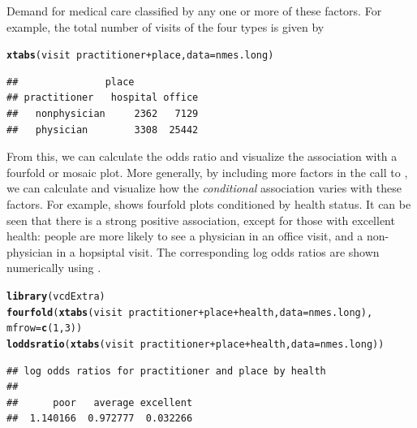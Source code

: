 \documentclass[11pt]{book}\usepackage[]{graphicx}\usepackage[]{color}
\makeatletter
\newcommand{\hlnum}[1]{\textcolor[rgb]{0.686,0.059,0.569}{#1}}%
\newcommand{\hlopt}[1]{\textcolor[rgb]{0,0,0}{#1}}%
\newcommand{\hlstd}[1]{\textcolor[rgb]{0.345,0.345,0.345}{#1}}%
\newcommand{\hlkwc}[1]{\textcolor[rgb]{0.333,0.667,0.333}{#1}}%
\newcommand{\hlkwd}[1]{\textcolor[rgb]{0.737,0.353,0.396}{\textbf{#1}}}%
\newenvironment{kframe}{%
 \def\at@end@of@kframe{}%
 \ifinner\ifhmode%
  \def\at@end@of@kframe{\end{minipage}}%
  \begin{minipage}{\columnwidth}%
 \fi\fi%
 \def\FrameCommand##1{\hskip\@totalleftmargin \hskip-\fboxsep
 \colorbox{shadecolor}{##1}\hskip-\fboxsep
     \hskip-\linewidth \hskip-\@totalleftmargin \hskip\columnwidth}%
 \MakeFramed {\advance\hsize-\width
   \@totalleftmargin\z@ \linewidth\hsize
   \@setminipage}}%
 {\par\unskip\endMakeFramed%
 \at@end@of@kframe}
\newenvironment{knitrout}{}{} %
\renewenvironment{knitrout}{\small\renewcommand{\baselinestretch}{.85}}{} %
\makeatother
\begin{document}
\begin{Example}[nmes4]{Demand for medical care}
classified by any one or more of these factors.  For example, the total number of visits of the four
types is given by
\begin{knitrout}
\color{fgcolor}\begin{kframe}
\begin{alltt}
\hlkwd{xtabs}\hlstd{(visit} \hlopt{~} \hlstd{practitioner} \hlopt{+} \hlstd{place,} \hlkwc{data}\hlstd{=nmes.long)}
\end{alltt}
\begin{verbatim}
##               place
## practitioner   hospital office
##   nonphysician     2362   7129
##   physician        3308  25442
\end{verbatim}
\end{kframe}
\end{knitrout}
From this, we can calculate the odds ratio and visualize the association with a fourfold or
mosaic plot. More generally, by including more factors in the call to , we can
calculate and visualize how the \emph{conditional} association varies with these factors.
For example,  shows fourfold plots conditioned by health status.
It can be seen that there is a strong positive association, except for those with
excellent health: people are more likely to see a physician in an office visit, and a
non-physician in a hopsiptal visit. The corresponding log odds ratios are shown numerically
using .

\begin{knitrout}
\color{fgcolor}\begin{kframe}
\begin{alltt}
\hlkwd{library}\hlstd{(vcdExtra)}
\hlkwd{fourfold}\hlstd{(}\hlkwd{xtabs}\hlstd{(visit} \hlopt{~} \hlstd{practitioner} \hlopt{+} \hlstd{place} \hlopt{+} \hlstd{health,} \hlkwc{data}\hlstd{=nmes.long),}
         \hlkwc{mfrow}\hlstd{=}\hlkwd{c}\hlstd{(}\hlnum{1}\hlstd{,}\hlnum{3}\hlstd{))}
\hlkwd{loddsratio}\hlstd{(}\hlkwd{xtabs}\hlstd{(visit} \hlopt{~} \hlstd{practitioner} \hlopt{+} \hlstd{place} \hlopt{+} \hlstd{health,} \hlkwc{data}\hlstd{=nmes.long))}
\end{alltt}
\begin{verbatim}
## log odds ratios for practitioner and place by health 
## 
##      poor   average excellent 
##  1.140166  0.972777  0.032266
\end{verbatim}
\end{kframe}\begin{figure}[!htbp]


\end{figure}
\end{knitrout}
\end{Example}
\end{document}
